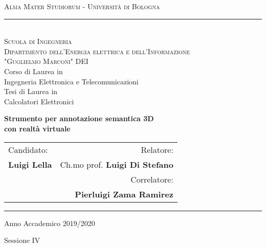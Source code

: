 \begin{titlepage}
$\;$
 \vspace{-1.0 true cm}
\begin{center}
    {\large  \textsc{Alma Mater Studiorum - Universit\`{a} di Bologna}} \\
    \rule{13.2cm}{.5pt} \\
    \vspace{3mm}
  {\normalsize \textsc {Scuola di Ingegneria \\
  	Dipartimento dell'Energia elettrica e dell'Informazione \\
    "Guglielmo Marconi" DEI} \\
  \vspace{1.0 true cm}
  Corso di Laurea in \\
  Ingegneria Elettronica e Telecomunicazioni \\
  \vspace{5mm}
  Tesi di Laurea in \\
  Calcolatori Elettronici}
\end{center}

\vspace{2.5 true cm}

\begin{center}
    {\Large \textbf{Strumento per annotazione semantica 3D
    \\ \vspace{0.3cm}con realtà virtuale}}

    \vspace{2.5 cm}
\end{center}


\vfill \normalsize {
    \begin{tabular}{lr}
        Candidato:      &  \hspace{5cm} Relatore:    \\
    \textbf{Luigi Lella}         &  Ch.mo prof. \textbf{Luigi Di Stefano} \\	
          &  \hspace{8cm} Correlatore:    \\
    \label{key}      &  \hspace{5cm} \textbf{Pierluigi Zama Ramirez}    \\
    						       
    \end{tabular}
} \vspace{2.5 cm}



 \rule{13.2cm}{.5pt}
 \small
 \begin{center}
 \normalsize Anno Accademico 2019/2020 \\
 \end{center}
\begin{center}
	\normalsize Sessione IV \\
\end{center}


\end{titlepage}

